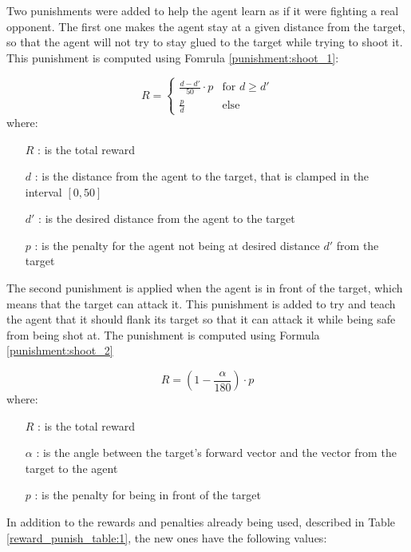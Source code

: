 Two punishments were added to help the agent learn as if it were fighting a real opponent. The first one makes the agent stay at a given distance from the target, so that the agent will not try to stay glued to the target while trying to shoot it. This punishment is computed using Fomrula \ref{punishment:shoot_1}:

\begin{equation} \label{punishment:shoot_1}
    R = \begin{cases}
        \frac{d - d'}{50} \cdot p & \text{for } d \geq d' \\
        \frac{p}{d} & \text{else}
    \end{cases}
\end{equation}
where:
\begin{itemize}
    \item [$R$]: is the total reward
    \item [$d$]: is the distance from the agent to the target, that is clamped in the interval $[0, 50]$
    \item [$d'$]: is the desired distance from the agent to the target
    \item [$p$]: is the penalty for the agent not being at desired distance $d'$ from the target
\end{itemize}

The second punishment is applied when the agent is in front of the target, which means that the target can attack it. This punishment is added to try and teach the agent that it should flank its target so that it can attack it while being safe from being shot at. The punishment is computed using Formula \ref{punishment:shoot_2}

\begin{equation} \label{punishment:shoot_2}
    R = (1 - \frac{\alpha}{180}) \cdot p
\end{equation}
where:
\begin{itemize}
    \item [$R$]: is the total reward
    \item [$\alpha$]: is the angle between the target's forward vector and the vector from the target to the agent
    \item [$p$]: is the penalty for being in front of the target
\end{itemize}

In addition to the rewards and penalties already being used, described in Table \ref{reward_punish_table:1}, the new ones have the following values:

